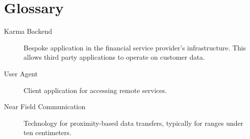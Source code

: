 \chapter*{Glossary}


\begin{description}
  \item[Karma Backend] Bespoke application in the financial service provider's infrastructure. This allows third party applications to operate on customer data.
  \item[User Agent] Client application for accessing remote services.
    \item[Near Field Communication] Technology for proximity-based data transfers, typically for ranges under ten centimeters.
\end{description}
